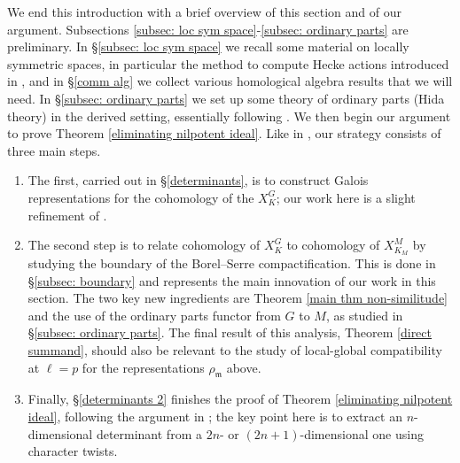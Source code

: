 \documentclass{amsart}
\theoremstyle{remark}
\numberwithin{equation}{subsection}
\newcommand{\m}{\frakm}
\newcommand{\frakm}{\mathfrak{m}}
\renewcommand{\(}{\left(}
\renewcommand{\)}{\right)}
\begin{document}
\medskip

We end this introduction with a brief overview of this section and of our argument. Subsections \ref{subsec: loc sym space}-\ref{subsec: ordinary parts} are preliminary. In \S \ref{subsec: loc sym space} we recall some material on locally symmetric spaces, in particular the method to compute Hecke actions introduced in \cite{newton-thorne}, and in \S \ref{comm alg} we collect various homological algebra results that we will need. In \S \ref{subsec: ordinary parts} we set up some theory of ordinary parts (Hida theory) in the derived setting, essentially following \cite{khare-thorne}. We then begin our argument to prove Theorem \ref{eliminating nilpotent ideal}. Like in \cite{scholze-galois,newton-thorne}, our strategy consists of three main steps. 
\begin{enumerate}
\item The first, carried out in \S \ref{determinants}, is to construct Galois representations for the cohomology of the $X^G_K$; our work here is a slight refinement of \cite{scholze-galois,newton-thorne}. 
\item The second step is to relate cohomology of $X^G_K$ to cohomology of $X_{K_M}^M$ by studying the boundary of the Borel--Serre compactification. This is done in \S \ref{subsec: boundary} and represents the main innovation of our work in this section. The two key new ingredients are Theorem \ref{main thm non-similitude} and the use of the ordinary parts functor from $G$ to $M$, as studied in \S \ref{subsec: ordinary parts}. The final result of this analysis, Theorem \ref{direct summand}, should also be relevant to the study of local-global compatibility at $\ell = p$ for the representations $\rho_\m$ above. 
\item Finally, \S \ref{determinants 2} finishes the proof of Theorem \ref{eliminating nilpotent ideal}, following the argument in \cite{newton-thorne}; the key point here is to extract an $n$-dimensional determinant from a $2n$- or $(2n+1)$-dimensional one using character twists.
\end{enumerate}
\end{document}
